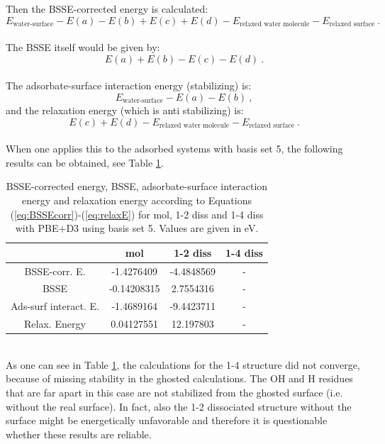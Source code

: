 \documentclass[11pt,DIV=13,BCOR=5mm,a4paper,headinclude]{scrbook}
\begin{document}
Then the BSSE-corrected energy is calculated:
\begin{equation}\label{eq:BSSEcorr}
 E_{\textrm{water-surface}}-E(a)-E(b)+E(c)+E(d)-E_{\textrm{relaxed water molecule}}-E_{\textrm{relaxed surface}} ~.
\end{equation}
\\
The BSSE itself would be given by:
\begin{equation}
 E(a)+E(b)-E(c)-E(d) ~.
\end{equation}
\\
The adsorbate-surface interaction energy (stabilizing) is:
\begin{equation}
 E_{\textrm{water-surface}}-E(a)-E(b) ~,
\end{equation}
and the relaxation energy (which is anti stabilizing) is:
\begin{equation}\label{eq:relaxE}
 E(c)+E(d)-E_{\textrm{relaxed water molecule}}-E_{\textrm{relaxed surface}} ~.
\end{equation}
\\
When one applies this to the adsorbed systems with basis set 5, the following results can be obtained, see Table \ref{tab:bsse-results}.
\begin{table}[!h]
  \centering
   \caption{BSSE-corrected energy, BSSE, adsorbate-surface interaction energy and relaxation energy according to Equations (\ref{eq:BSSEcorr})-(\ref{eq:relaxE}) for mol, 1-2 diss and 1-4 diss with PBE+D3 using basis set 5.
Values are given in eV.}
  \begin{tabular}{c|ccc}
  \toprule
			& mol  & 1-2 diss & 1-4 diss \\\midrule
  BSSE-corr. E.		&-1.4276409 &-4.4848569 & -\\
  BSSE			&-0.14208315&2.7554316 & -\\
  Ads-surf interact. E.	&-1.4689164 &-9.4423711 & -\\
  Relax. Energy		&0.04127551 &12.197803 & -\\\bottomrule
  \end{tabular}
  \label{tab:bsse-results}
 \end{table}
 \\
As one can see in Table \ref{tab:bsse-results}, the calculations for the 1-4 structure did not converge, because of missing stability in the ghosted calculations.
The OH and H residues that are far apart in this case are not stabilized from the ghosted surface (i.e. without the real surface).
In fact, also the 1-2 dissociated structure without the surface might be energetically unfavorable and therefore it is questionable whether these results are reliable.
\end{document}
